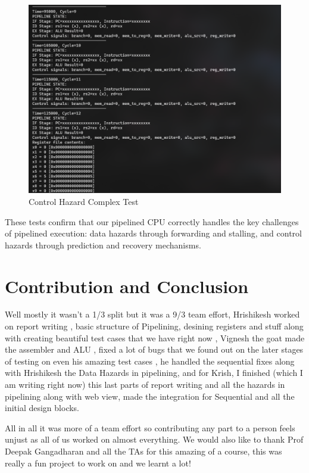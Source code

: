 \documentclass{article}
\numberwithin{figure}{section}
\numberwithin{table}{section}
\begin{document}
\begin{figure}[H]
    \centering
    \includegraphics[width=0.95\linewidth]{pipe_test7.png}
    \caption{Control Hazard Complex Test}
    \label{fig:pipe-test7}
\end{figure}

These tests confirm that our pipelined CPU correctly handles the key challenges of pipelined execution: data hazards through forwarding and stalling, and control hazards through prediction and recovery mechanisms.



\section{Contribution and Conclusion}

Well mostly it wasn't a 1/3 split but it was a 9/3 team effort, Hrishikesh worked on report writing , basic structure of Pipelining, desining registers and stuff along with creating beautiful test cases that we have right now , Vignesh the goat made the assembler and ALU , fixed a lot of bugs that we found out on the later stages of testing on even his amazing test cases , he handled the sequential fixes along with Hrishikesh the Data Hazards in pipelining, and for Krish, I finished (which I am writing right now) this last parts of report writing and all the hazards in pipelining along with web view, made the integration for Sequential and all the initial design blocks.

All in all it was more of a team effort so contributing any part to a person feels unjust as all of us worked on almost everything. We would also like to thank Prof Deepak Gangadharan and all the TAs for this amazing of a course, this was really a fun project to work on and we learnt a lot!
\end{document}
